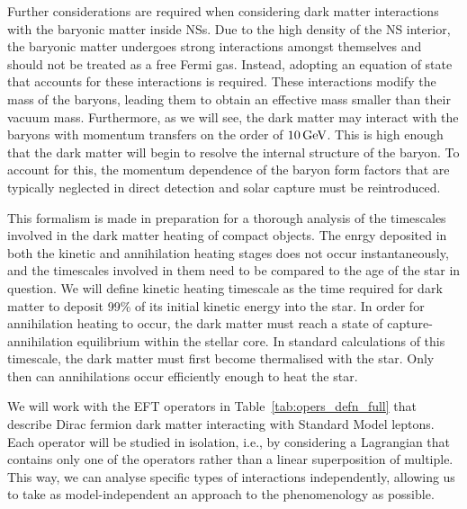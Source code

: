 Further considerations are required when considering dark matter interactions with the baryonic matter inside NSs. Due to the high density of the NS interior, the baryonic matter undergoes strong interactions amongst themselves and should not be treated as a free Fermi gas. Instead, adopting an equation of state that accounts for these interactions is required. These interactions modify the mass of the baryons, leading them to obtain an effective mass smaller than their vacuum mass. Furthermore, as we will see, the dark matter may interact with the baryons with momentum transfers on the order of $10{\rm \,GeV}$. This is high enough that the dark matter will begin to resolve the internal structure of the baryon. To account for this, the momentum dependence of the baryon form factors that are typically neglected in direct detection and solar capture must be reintroduced.

This formalism is made in preparation for a thorough analysis of the timescales involved in the dark matter heating of compact objects. The enrgy deposited in both the kinetic and annihilation heating stages does not occur instantaneously, and the timescales involved in them need to be compared to the age of the star in question. We will define kinetic heating timescale as the time required for dark matter to deposit 99\% of its initial kinetic energy into the star. In order for annihilation heating to occur, the dark matter must reach a state of capture-annihilation equilibrium within the stellar core. In standard calculations of this timescale, the dark matter must first become thermalised with the star. Only then can annihilations occur efficiently enough to heat the star. 


We will work with the EFT operators in Table~\ref{tab:opers_defn_full} that describe Dirac fermion dark matter interacting with Standard Model leptons. Each operator will be studied in isolation, i.e., by considering a Lagrangian that contains only one of the operators rather than a linear superposition of multiple. This way, we can analyse specific types of interactions independently, allowing us to take as model-independent an approach to the phenomenology as possible. 